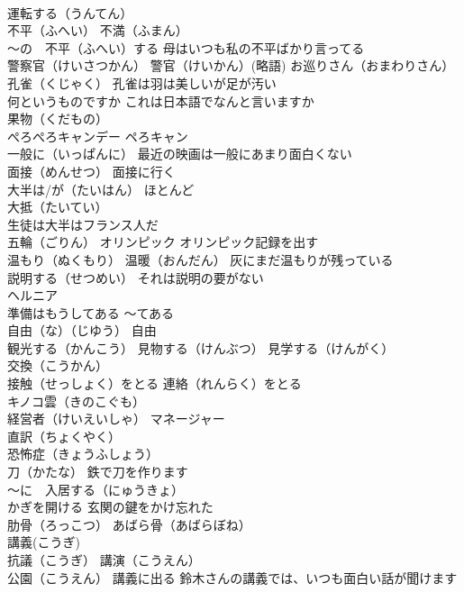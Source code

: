 \documentclass[8pt]{extreport}
\begin{document}
\begin{CJK}{UTF8}{min}
\\	運転する（うんてん）
\\	不平（ふへい） 不満（ふまん）
\\	～の　不平（ふへい）する 母はいつも私の不平ばかり言ってる
\\	警察官（けいさつかん） 警官（けいかん）(略語) お巡りさん（おまわりさん）
\\	孔雀（くじゃく） 孔雀は羽は美しいが足が汚い
\\	何というものですか これは日本語でなんと言いますか
\\	果物（くだもの）
\\	ぺろぺろキャンデー ペろキャン
\\	一般に（いっぱんに） 最近の映画は一般にあまり面白くない
\\	面接（めんせつ） 面接に行く
\\	大半は/が（たいはん） ほとんど 
\\	大抵（たいてい）
\\	生徒は大半はフランス人だ
\\	五輪（ごりん） オリンピック オリンピック記録を出す
\\	温もり（ぬくもり） 温暖（おんだん） 灰にまだ温もりが残っている
\\	説明する（せつめい） それは説明の要がない
\\	ヘルニア
\\	準備はもうしてある ～てある　
\\	自由（な）（じゆう） 自由
\\	観光する（かんこう） 見物する（けんぶつ） 見学する（けんがく）
\\	交換（こうかん）
\\	接触（せっしょく）をとる 連絡（れんらく）をとる
\\	キノコ雲（きのこぐも） 
\\	経営者（けいえいしゃ） マネージャー
\\	直訳（ちょくやく）
\\	恐怖症（きょうふしょう）
\\	刀（かたな） 鉄で刀を作ります
\\	～に　入居する（にゅうきょ）
\\	かぎを開ける 玄関の鍵をかけ忘れた
\\	肋骨（ろっこつ） あばら骨（あばらぼね）
\\	講義(こうぎ) 
\\	抗議（こうぎ） 講演（こうえん）
\\	公園（こうえん） 講義に出る 鈴木さんの講義では、いつも面白い話が聞けます

\end{CJK}
\end{document}

